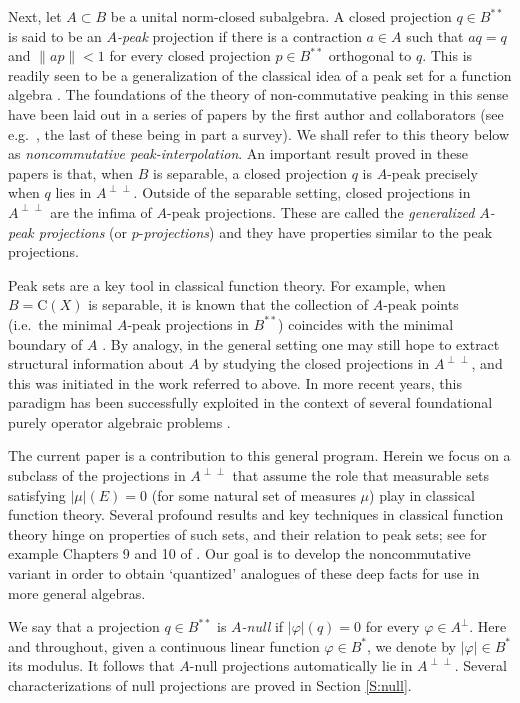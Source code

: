 \documentclass[10pt]{amsart}
\newcommand{\rC}{\mathrm{C}}
\renewcommand{\phi}{\varphi}
\theoremstyle{definition}
\begin{document}
Next, let $A\subset B$ be a unital norm-closed subalgebra. A closed projection $q\in B^{**}$ is said to be an \emph{$A$-peak} projection if there is a contraction $a\in A$ such that $aq=q$ and $\|ap\|<1$ for every closed projection $p\in B^{**}$ orthogonal to $q$. This is readily seen to be a generalization of the classical idea of a peak set for a function algebra \cite{gamelin1969}. The foundations of the theory of non-commutative peaking in this sense have been laid out in a series of papers by the first author and collaborators (see e.g.\ \cite{hay2007,BHN2008,BR2011,BN2012,BR2013,blecher2013}, the last of these being in part a survey).  We shall refer to this theory 
below as {\em noncommutative  peak-interpolation}. 
An important result proved in these papers is that, when $B$ is separable, a closed projection $q$ is $A$-peak precisely when $q$ lies in $A^{\perp\perp}$. Outside of the separable setting,   
closed projections in $A^{\perp\perp}$ are the infima of  $A$-peak projections.  These are called the {\em generalized $A$-peak projections} (or $p$-{\em projections}) and they have properties similar to the peak projections. 

Peak sets are a key tool in classical function theory.
  For example, when $B=\rC(X)$ is separable, it is known that the collection of $A$-peak points (i.e.\  the minimal $A$-peak projections in $B^{**}$) coincides with the minimal boundary of $A$ \cite{bishop1959, bishop1959bdry}. 
By analogy, in the general setting one may still hope to extract structural information about  $A$ by studying the closed projections in $A^{\perp\perp}$, and this was 
initiated in the work referred to above. In more recent years, this paradigm has been successfully exploited in the context of several foundational purely operator algebraic problems \cite{CTh2022,CTh2023,clouatre2023pure}. 


The current paper is a contribution to this general program. Herein we focus on a subclass of the projections in $A^{\perp\perp}$ that assume the role that measurable sets satisfying $|\mu|(E)=0$ (for some natural set of measures $\mu$) play in classical function theory.
Several profound results  and key techniques  in classical function theory hinge on properties of such sets, and their relation to peak sets;   see for example  Chapters 9 and 10 of \cite{rudin2008}.   Our 
goal is to develop the noncommutative variant in order to obtain `quantized' analogues of these 
deep facts for use in more general algebras.

We say that a projection $q\in B^{**}$ is \emph{$A$-null} 
if $|\phi|(q)=0$ for every $\phi\in A^{\perp}$. Here and throughout, given a continuous linear function $\phi\in B^*$, we denote by $|\phi|\in B^*$ its modulus.
 It follows that $A$-null projections automatically lie in $A^{\perp\perp}$. Several characterizations of null projections are proved in Section \ref{S:null}.
\end{document}
